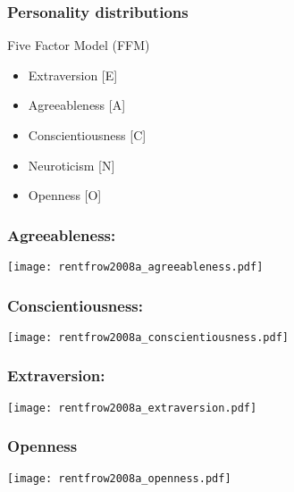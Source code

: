 \begin{frame}
  \frametitle{Personality distributions}

  \begin{block}{Five Factor Model (FFM)}
    \begin{itemize}
    \item 
      Extraversion [E]
    \item 
      Agreeableness [A]
    \item 
      Conscientiousness [C]
    \item 
      Neuroticism [N]
    \item 
      Openness [O]
    \end{itemize}

    \bigskip
    
    
    \bigskip

  \end{block}

\end{frame}

\begin{frame}
  \frametitle{Agreeableness:}

  \texttt{[image: rentfrow2008a\_agreeableness.pdf]}

\end{frame}

\begin{frame}
  \frametitle{Conscientiousness:}

  \texttt{[image: rentfrow2008a\_conscientiousness.pdf]}

\end{frame}

\begin{frame}
  \frametitle{Extraversion:}

  \texttt{[image: rentfrow2008a\_extraversion.pdf]}

\end{frame}

\begin{frame}
  \frametitle{Openness}

  \texttt{[image: rentfrow2008a\_openness.pdf]}

\end{frame}

